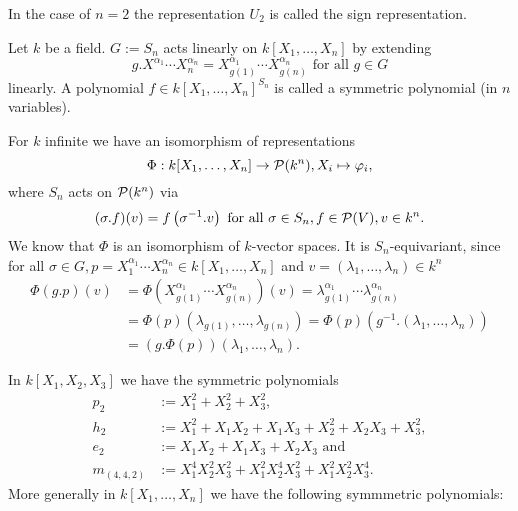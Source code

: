 \begin{rem}
 In the case of $n = 2$ the representation $U_2$ is called the sign representation.
\end{rem}


\begin{defi}
 Let $k$ be a field. $G := S_n$ acts linearly on $k[X_1, \ldots, X_n]$ by extending
 \[
  g.X^{\alpha_1} \cdots X_n^{\alpha_n} = X_{g(1)}^{\alpha_1} \cdots X_{g(n)}^{\alpha_n} \text{ for all } g \in G
 \]
 linearly. A polynomial $f \in k[X_1, \ldots, X_n]^{S_n}$ is called a symmetric polynomial (in $n$ variables).
\end{defi}


\begin{rem}
 For $k$ infinite we have an isomorphism of representations
 \[
  \Phi : k[X_1, \ldots, X_n] \to \mathcal{P}(k^n), X_i \mapsto \varphi_i,
 \]
 where $S_n$ acts on $\mathcal{P}(k^n)$ via
 \[
  (\sigma.f)(v) = f\left( \sigma^{-1}.v \right) \text{ for all } \sigma \in S_n, f \in \mathcal{P}(V), v \in k^n.
 \]
 We know that $\Phi$ is an isomorphism of $k$-vector spaces. It is $S_n$-equivariant, since for all $\sigma \in G, p = X_1^{\alpha_1} \cdots X_n^{\alpha_n} \in k[X_1, \ldots, X_n]$ and $v = (\lambda_1, \ldots, \lambda_n) \in k^n$
 \begin{align*}
  \Phi(g.p)(v)
  &= \Phi\left( X_{g(1)}^{\alpha_1} \cdots X_{g(n)}^{\alpha_n} \right)(v)
  = \lambda_{g(1)}^{\alpha_1} \cdots \lambda_{g(n)}^{\alpha_n} \\
  &= \Phi(p)( \lambda_{g(1)}, \ldots, \lambda_{g(n)} )
  = \Phi(p)\left( g^{-1}.(\lambda_1, \ldots, \lambda_n) \right) \\
  &= (g.\Phi(p))(\lambda_1, \ldots, \lambda_n).
 \end{align*}
\end{rem}


\begin{expl}
 In $k[X_1, X_2, X_3]$ we have the symmetric polynomials
 \begin{align*}
  p_2 &:= X_1^2 + X_2^2 + X_3^2, \\
  h_2 &:= X_1^2 + X_1 X_2 + X_1 X_3 + X_2^2 + X_2 X_3 + X_3^2, \\
  e_2 &:= X_1 X_2 + X_1 X_3 + X_2 X_3 \text{ and} \\
  m_{(4,4,2)} &:= X_1^4 X_2^2 X_3^2 + X_1^2 X_2^4 X_3^2 + X_1^2 X_2^2 X_3^4.
 \end{align*}
 More generally in $k[X_1, \ldots, X_n]$ we have the following symmmetric polynomials:
\end{expl}


